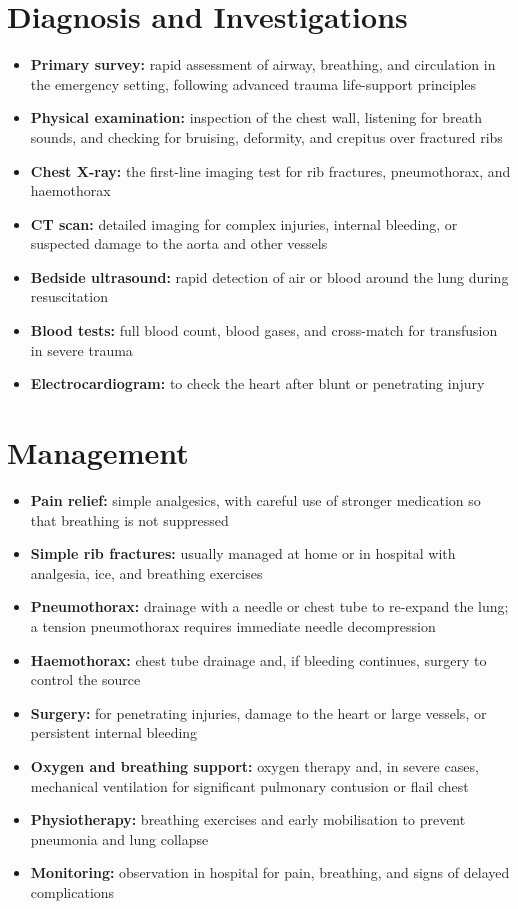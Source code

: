 \section*{Diagnosis and Investigations}
\begin{itemize}
    \item \textbf{Primary survey:} rapid assessment of airway, breathing, and circulation in the emergency setting, following advanced trauma life-support principles
    \item \textbf{Physical examination:} inspection of the chest wall, listening for breath sounds, and checking for bruising, deformity, and crepitus over fractured ribs
    \item \textbf{Chest X-ray:} the first-line imaging test for rib fractures, pneumothorax, and haemothorax
    \item \textbf{CT scan:} detailed imaging for complex injuries, internal bleeding, or suspected damage to the aorta and other vessels
    \item \textbf{Bedside ultrasound:} rapid detection of air or blood around the lung during resuscitation
    \item \textbf{Blood tests:} full blood count, blood gases, and cross-match for transfusion in severe trauma
    \item \textbf{Electrocardiogram:} to check the heart after blunt or penetrating injury
\end{itemize}

\section*{Management}
\begin{itemize}
    \item \textbf{Pain relief:} simple analgesics, with careful use of stronger medication so that breathing is not suppressed
    \item \textbf{Simple rib fractures:} usually managed at home or in hospital with analgesia, ice, and breathing exercises
    \item \textbf{Pneumothorax:} drainage with a needle or chest tube to re-expand the lung; a tension pneumothorax requires immediate needle decompression
    \item \textbf{Haemothorax:} chest tube drainage and, if bleeding continues, surgery to control the source
    \item \textbf{Surgery:} for penetrating injuries, damage to the heart or large vessels, or persistent internal bleeding
    \item \textbf{Oxygen and breathing support:} oxygen therapy and, in severe cases, mechanical ventilation for significant pulmonary contusion or flail chest
    \item \textbf{Physiotherapy:} breathing exercises and early mobilisation to prevent pneumonia and lung collapse
    \item \textbf{Monitoring:} observation in hospital for pain, breathing, and signs of delayed complications
\end{itemize}

